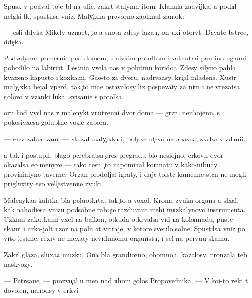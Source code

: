 \documentclass[10pt]{book}
\begin{document}
Spusk v podval toje b{\yi}l na uli{\q}e, zakr{\yi}t{\yi}{\y} stalyn{\yi}m {\x}itom. Kla{\q}nula zadvijka, {\y}a podn{\ia}l nel{\e}gki{\y} l{\iu}k, spustilsa vniz. Maly{\c}ixka provorno za{\x}olknul zamok:

— {\Y}esli d{\ia}dyka Mikely uzna{\y}et, {\c}to {\y}a snova zdesy laza{\y}u, on uxi otorv{\e}t. Dava{\y}te b{\yi}stre{\y}e, d{\ia}de{\c}ka.

Podvalyno{\y}e pome{\x}eni{\y}e pod domom, s nizkim potolkom i zat{\ia}nut{\yi}mi pautino{\y} uglami pohodilo na labirint. Lestni{\q}a v{\yi}vela nas v polut{\e}mn{\yi}{\y} koridor. Zdesy silyno pahlo kvaxeno{\y} kapusto{\y} i koxkami. Gde-to za dver{\y}u, nadr{\yi}va{\y}asy, kri{\c}al mladene{\q}. Xustr{\yi}{\y} maly{\c}ixka bejal vper{\e}d, tak {\c}to mne ostavalosy lix pospevaty za nim i ne vrezatsa golovo{\y} v v{\ia}zanki luka, svisa{\y}u{\x}i{\y}e s potolka.

{\C}orn{\yi}{\y} hod v{\yi}vel nas v malenyki{\y} vnutrenni{\y} dvor doma — gr{\ia}zn{\yi}{\y}, neuhojenn{\yi}{\y}, s pokosivxe{\y}sa golub{\ia}tne{\y} vozle zabora.

— {\C}erez zabor vam, — skazal maly{\c}ixka i, bolyxe ni{\c}evo ne ob{\y}asn{\ia}{\y}a, skr{\yi}lsa v zdani{\y}i.

{\Y}a tak i postupil, blago perebratsa {\c}erez pregradu b{\yi}lo neslojno. {\Q}erkovn{\yi}{\y} dvor okazalsa {\y}e{\x}o menyxe — tako{\y} tesn{\yi}{\y}, {\c}to napominal komnatu v kako{\y}-nibudy provin{\q}ialyno{\y} taverne. Organ prodoljal igraty, i daje tolst{\yi}{\y}e kamenn{\yi}{\y}e sten{\yi} ne mogli prigluxity {\y}evo veli{\c}estvenn{\yi}{\y}e zvuki.

Malenyka{\y}a kalitka b{\yi}la poluotkr{\yi}ta, tak {\c}to {\y}a voxol. Krome zvuka organa {\y}a sl{\yi}xal, kak nahod{\ia}{\x}i{\y}esa vnizu podsobn{\yi}{\y}e rabo{\c}i{\y}e razduva{\y}ut mehi muz{\yi}kalynovo instrumenta. Uzkimi zakutkami v{\yi}xel na balkon, otkuda otkr{\yi}valsa vid na kolonnadu, pust{\yi}{\y}e skam{\yf}i i {\y}arko-jolt{\yi}{\y} uzor na polu ot vitraje{\y}, v kotor{\yi}{\y}e svetilo soln{\q}e. Spustilsa vniz po vito{\y} lestni{\q}e, rexiv ne mexaty nevidimomu organistu, i sel na pervu{\y}u skam{\y}u.

Zakr{\yi}l glaza, sluxa{\y}a muz{\yi}ku. Ona b{\yi}la grandiozno{\y}, ob{\y}omno{\y} i, kazalosy, pronzala teb{\ia} naskvozy.

— Potr{\ia}sa{\y}u{\x}e, — prozvu{\c}al u men{\ia} nad uhom golos Propovednika. — V ko{\y}i-to veki t{\yi} dovolen, nahod{\ia}sy v {\q}erkvi.
\end{document}
